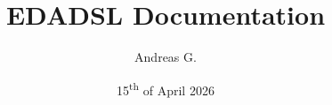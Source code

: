 \documentclass{report}
\title{EDADSL Documentation}
\author{Andreas G.}
\date{15\textsuperscript{th} of April 2026}
\begin{document}
\large
\maketitle
\clearpage
\tableofcontents
\clearpage
%
%
% 
% 
% 
% 
% 
% 
% 
% 
% 











\end{document}
